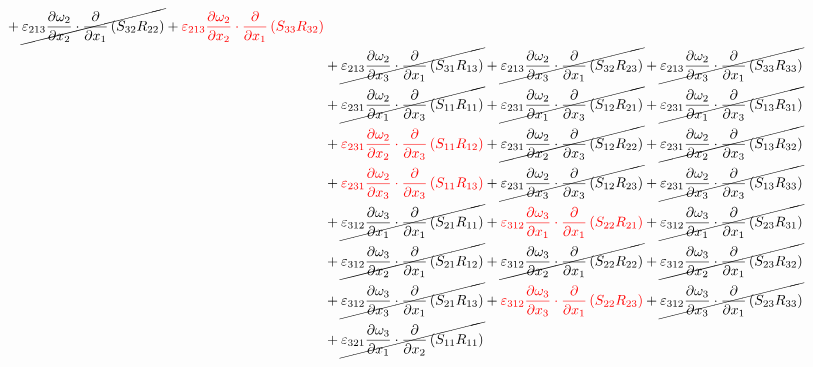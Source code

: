 \begin{equation}
\begin{split}
{}		+\cancel{\varepsilon_{213}\pdv{\omega_{2}}{x_{2}}\cdot\pdv{}{x_{1}}\left(S_{32}R_{22}\right)
}		+{\color{red}\varepsilon_{213}\pdv{\omega_{2}}{x_{2}}\cdot\pdv{}{x_{1}}\left(S_{33}R_{32}\right)
}\\ 
		&+\cancel{\varepsilon_{213}\pdv{\omega_{2}}{x_{3}}\cdot\pdv{}{x_{1}}\left(S_{31}R_{13}\right)
}		+\cancel{\varepsilon_{213}\pdv{\omega_{2}}{x_{3}}\cdot\pdv{}{x_{1}}\left(S_{32}R_{23}\right)
}		+\cancel{\varepsilon_{213}\pdv{\omega_{2}}{x_{3}}\cdot\pdv{}{x_{1}}\left(S_{33}R_{33}\right)
}\\ 
		&+\cancel{\varepsilon_{231}\pdv{\omega_{2}}{x_{1}}\cdot\pdv{}{x_{3}}\left(S_{11}R_{11}\right)
}		+\cancel{\varepsilon_{231}\pdv{\omega_{2}}{x_{1}}\cdot\pdv{}{x_{3}}\left(S_{12}R_{21}\right)
}		+\cancel{\varepsilon_{231}\pdv{\omega_{2}}{x_{1}}\cdot\pdv{}{x_{3}}\left(S_{13}R_{31}\right)
}\\ 
		&+{\color{red}\varepsilon_{231}\pdv{\omega_{2}}{x_{2}}\cdot\pdv{}{x_{3}}\left(S_{11}R_{12}\right)
}		+\cancel{\varepsilon_{231}\pdv{\omega_{2}}{x_{2}}\cdot\pdv{}{x_{3}}\left(S_{12}R_{22}\right)
}		+\cancel{\varepsilon_{231}\pdv{\omega_{2}}{x_{2}}\cdot\pdv{}{x_{3}}\left(S_{13}R_{32}\right)
}\\ 
		&+{\color{red}\varepsilon_{231}\pdv{\omega_{2}}{x_{3}}\cdot\pdv{}{x_{3}}\left(S_{11}R_{13}\right)
}		+\cancel{\varepsilon_{231}\pdv{\omega_{2}}{x_{3}}\cdot\pdv{}{x_{3}}\left(S_{12}R_{23}\right)
}		+\cancel{\varepsilon_{231}\pdv{\omega_{2}}{x_{3}}\cdot\pdv{}{x_{3}}\left(S_{13}R_{33}\right)
}\\ 
		&+\cancel{\varepsilon_{312}\pdv{\omega_{3}}{x_{1}}\cdot\pdv{}{x_{1}}\left(S_{21}R_{11}\right)
}		+{\color{red}\varepsilon_{312}\pdv{\omega_{3}}{x_{1}}\cdot\pdv{}{x_{1}}\left(S_{22}R_{21}\right)
}		+\cancel{\varepsilon_{312}\pdv{\omega_{3}}{x_{1}}\cdot\pdv{}{x_{1}}\left(S_{23}R_{31}\right)
}\\ 
		&+\cancel{\varepsilon_{312}\pdv{\omega_{3}}{x_{2}}\cdot\pdv{}{x_{1}}\left(S_{21}R_{12}\right)
}		+\cancel{\varepsilon_{312}\pdv{\omega_{3}}{x_{2}}\cdot\pdv{}{x_{1}}\left(S_{22}R_{22}\right)
}		+\cancel{\varepsilon_{312}\pdv{\omega_{3}}{x_{2}}\cdot\pdv{}{x_{1}}\left(S_{23}R_{32}\right)
}\\ 
		&+\cancel{\varepsilon_{312}\pdv{\omega_{3}}{x_{3}}\cdot\pdv{}{x_{1}}\left(S_{21}R_{13}\right)
}		+{\color{red}\varepsilon_{312}\pdv{\omega_{3}}{x_{3}}\cdot\pdv{}{x_{1}}\left(S_{22}R_{23}\right)
}		+\cancel{\varepsilon_{312}\pdv{\omega_{3}}{x_{3}}\cdot\pdv{}{x_{1}}\left(S_{23}R_{33}\right)
}\\ 
		&+\cancel{\varepsilon_{321}\pdv{\omega_{3}}{x_{1}}\cdot\pdv{}{x_{2}}\left(S_{11}R_{11}\right)
}
\end{split}
\end{equation}
